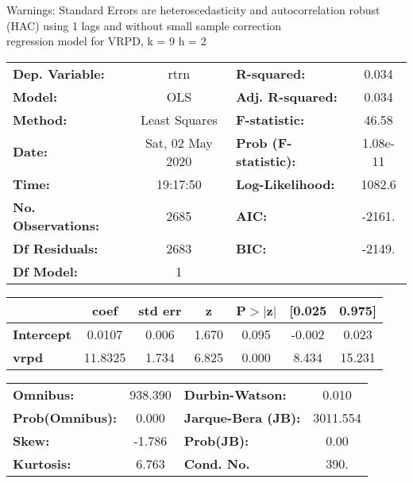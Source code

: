 Warnings: \newline
 [1] Standard Errors are heteroscedasticity and autocorrelation robust (HAC) using 1 lags and without small sample correction\\ 

regression model for VRPD, k = 9 h = 2\begin{center}
\begin{tabular}{lclc}
\toprule
\textbf{Dep. Variable:}    &       rtrn       & \textbf{  R-squared:         } &     0.034   \\
\textbf{Model:}            &       OLS        & \textbf{  Adj. R-squared:    } &     0.034   \\
\textbf{Method:}           &  Least Squares   & \textbf{  F-statistic:       } &     46.58   \\
\textbf{Date:}             & Sat, 02 May 2020 & \textbf{  Prob (F-statistic):} &  1.08e-11   \\
\textbf{Time:}             &     19:17:50     & \textbf{  Log-Likelihood:    } &    1082.6   \\
\textbf{No. Observations:} &        2685      & \textbf{  AIC:               } &    -2161.   \\
\textbf{Df Residuals:}     &        2683      & \textbf{  BIC:               } &    -2149.   \\
\textbf{Df Model:}         &           1      & \textbf{                     } &             \\
\bottomrule
\end{tabular}
\begin{tabular}{lcccccc}
                   & \textbf{coef} & \textbf{std err} & \textbf{z} & \textbf{P$> |$z$|$} & \textbf{[0.025} & \textbf{0.975]}  \\
\midrule
\textbf{Intercept} &       0.0107  &        0.006     &     1.670  &         0.095        &       -0.002    &        0.023     \\
\textbf{vrpd}      &      11.8325  &        1.734     &     6.825  &         0.000        &        8.434    &       15.231     \\
\bottomrule
\end{tabular}
\begin{tabular}{lclc}
\textbf{Omnibus:}       & 938.390 & \textbf{  Durbin-Watson:     } &    0.010  \\
\textbf{Prob(Omnibus):} &   0.000 & \textbf{  Jarque-Bera (JB):  } & 3011.554  \\
\textbf{Skew:}          &  -1.786 & \textbf{  Prob(JB):          } &     0.00  \\
\textbf{Kurtosis:}      &   6.763 & \textbf{  Cond. No.          } &     390.  \\
\bottomrule
\end{tabular}
\end{center}

